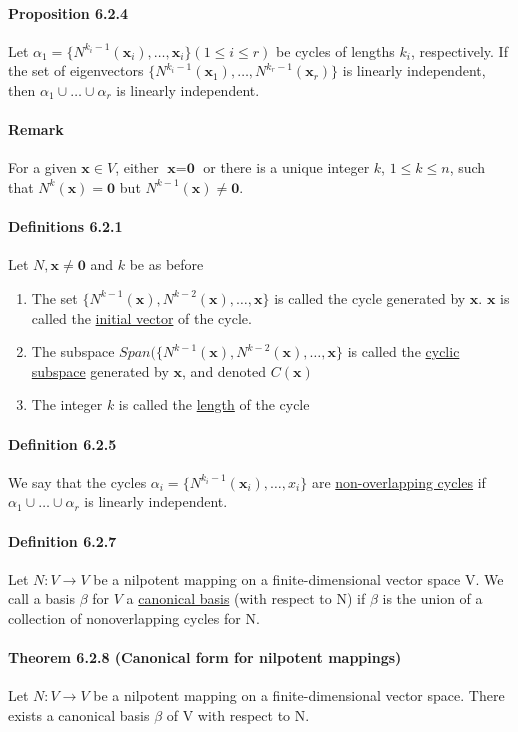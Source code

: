 \documentclass[11pt]{article}
\newcommand{\tb}[1]{\textbf{#1}}
\newcommand{\under}[1]{\underline{#1}}
\newcommand{\vx}[0]{\tb{x}}
\newcommand{\vo}[0]{\tb{0}}
\begin{document}
{\paragraph{Proposition 6.2.4} Let $\alpha_1 = \{N^{k_i - 1}(\vx_i),\hdots,\vx_i\} (1\leq i \leq r)$ be cycles of lengths $k_i$, respectively. If the set of eigenvectors $\{N^{k_i-1}(\vx_1),\hdots,N^{k_r-1}(\vx_r)\}$ is linearly independent, then $\alpha_1 \cup \hdots \cup \alpha_r$ is linearly independent.
\paragraph{Remark} For a given $\vx \in V$, either $\vx = \vo$ or there is a unique integer $k$, $1 \leq k \leq n$, such that $N^k(\vx) = \vo$ but $N^{k-1}(\vx) \neq \vo$. 
\paragraph{Definitions 6.2.1} Let $N, \vx \neq \vo$ and $k$ be as before
\begin{enumerate}
	\item The set $\{ N^{k-1}(\vx),N^{k-2}(\vx),\hdots,\vx\}$ is called the cycle generated by $\vx$. $\vx$ is called the \under{initial vector} of the cycle.
	\item The subspace $Span(\{N^{k-1}(\vx), N^{k-2}(\vx),\hdots,\vx\}$ is called the \under{cyclic subspace} generated by $\vx$, and denoted $C(\vx)$
	\item The integer $k$ is called the \under{length} of the cycle
\end{enumerate}
\paragraph{Definition 6.2.5} We say that the cycles $\alpha_i = \{N^{k_i-1}(\vx_i),\hdots,x_i\}$ are \under{non-overlapping cycles} if $\alpha_1 \cup \hdots \cup \alpha_r$ is linearly independent.
\paragraph{Definition 6.2.7} Let $N: V \rightarrow V$ be a nilpotent mapping on a finite-dimensional vector space V. We call a basis $\beta$ for $V$ a \under{canonical basis} (with respect to N) if $\beta$ is the union of a collection of nonoverlapping cycles for N.
\paragraph{Theorem 6.2.8 (Canonical form for nilpotent mappings)} Let $N: V \rightarrow V$ be a nilpotent mapping on a finite-dimensional vector space. There exists a canonical basis $\beta$ of V with respect to N.
}
\end{document}
